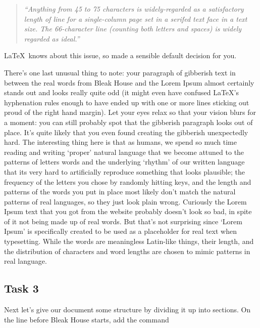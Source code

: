 \begin{quote}
\emph{
``Anything from 45 to 75 characters is widely-regarded as a satisfactory length of line for a single-column page set in a serifed text face in a text size. The 66-character line (counting both letters and spaces) is widely regarded as ideal.''}
\end{quote}

\LaTeX\ knows about this issue, so made a sensible default decision for you. 

There's one last unusual thing to note: your paragraph of gibberish text in between the real words from Bleak House and the Lorem Ipsum almost certainly stands out and looks really quite odd (it might even have confused \LaTeX's hyphenation rules enough to have ended up with one or more lines sticking out proud of the right hand margin).  Let your eyes relax so that your vision blurs for a moment: you can still probably spot that the gibberish paragraph looks out of place. It's quite likely that you even found creating the gibberish unexpectedly hard. The interesting thing here is that as humans, we spend so much time reading and writing `proper' natural language that we become attuned to the patterns of letters words and the underlying `rhythm' of our written language that its very hard to artificially reproduce something that looks plausible; the frequency of the letters you chose by randomly hitting keys, and the length and patterns of the words you put in place most likely don't match the natural patterns of real languages, so they just look plain wrong.  Curiously the Lorem Ipsum text that you got from the website probably doesn't look so bad, in spite of it not being made up of real words. But that's not surprising since `Lorem Ipsum' is specifically created to be used as a placeholder for real text when typesetting. While the words are meaningless Latin-like things, their length, and the distribution of characters and word lengths are chosen to mimic patterns in real language.

\subsection{Task 3}
\label{sec:task-3}

Next let's give our document some structure by dividing it up into sections. On the line before Bleak House starts, add the command

